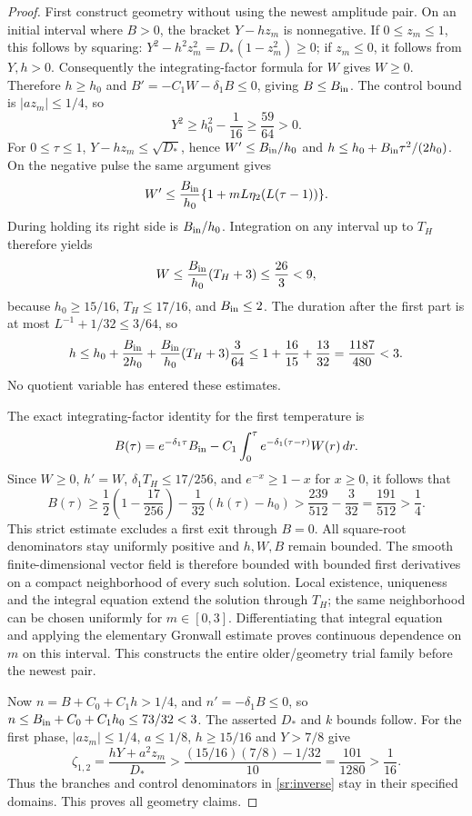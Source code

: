 \begin{proof}
First construct geometry without using the newest amplitude pair.
On an initial interval where $B>0$, the bracket $Y-hz_m$ is
nonnegative. If $0\leq z_m\leq1$, this follows by squaring:
$Y^2-h^2z_m^2=D_*(1-z_m^2)\geq0$; if $z_m\leq0$, it follows
from $Y,h>0$. Consequently the integrating-factor formula for $W$
gives $W\geq0$. Therefore $h\geq h_0$ and
$B'=-C_1W-\delta_1B\leq0$, giving $B\leq B_{\rm in}$.
The control bound is $|az_m|\leq1/4$, so
\[
 Y^2\geq h_0^2-\frac1{16}\geq\frac{59}{64}>0.
\]
For $0\leq\tau\leq1$, $Y-hz_m\leq\sqrt{D_*}$, hence
$W'\leq B_{\rm in}/h_0$ and
$h\leq h_0+B_{\rm in}\tau^2/(2h_0)$.
On the negative pulse the same argument gives
\[
 W'\leq\frac{B_{\rm in}}{h_0}
          \{1+mL\eta_2(L(\tau-1))\}.
\]
During holding its right side is $B_{\rm in}/h_0$.
Integration on any interval up to $T_H$ therefore yields
\[
 W\leq\frac{B_{\rm in}}{h_0}(T_H+3)
 \leq\frac{26}{3}<9,
\]
because $h_0\geq15/16$, $T_H\leq17/16$, and $B_{\rm in}\leq2$.
The duration after the first part is at most
$L^{-1}+1/32\leq3/64$, so
\[
 h\leq h_0+\frac{B_{\rm in}}{2h_0}
       +\frac{B_{\rm in}}{h_0}(T_H+3)\frac3{64}
 \leq1+\frac{16}{15}+\frac{13}{32}
 =\frac{1187}{480}<3.
\]
No quotient variable has entered these estimates.

The exact integrating-factor identity for the first temperature is
\[
 B(\tau)=e^{-\delta_1\tau}B_{\rm in}
  -C_1\int_0^\tau e^{-\delta_1(\tau-r)}W(r)\,dr.
\]
Since $W\geq0$, $h'=W$, $\delta_1T_H\leq17/256$, and
$e^{-x}\geq1-x$ for $x\geq0$, it follows that
\[
 B(\tau)\geq\frac12\left(1-\frac{17}{256}\right)
          -\frac1{32}(h(\tau)-h_0)
 >\frac{239}{512}-\frac3{32}
 =\frac{191}{512}>\frac14.
\]
This strict estimate excludes a first exit through $B=0$.
All square-root denominators stay uniformly positive and $h,W,B$
remain bounded. The smooth finite-dimensional vector field is therefore
bounded with bounded first derivatives on a compact neighborhood
of every such solution. Local existence, uniqueness and the integral
equation extend the solution through $T_H$; the same neighborhood
can be chosen uniformly for $m\in[0,3]$. Differentiating that integral
equation and applying the elementary Gronwall estimate proves
continuous dependence on $m$ on this interval. This constructs the
entire older/geometry trial family before the newest pair.

Now $n=B+C_0+C_1h>1/4$, and
$n'=-\delta_1B\leq0$, so
$n\leq B_{\rm in}+C_0+C_1h_0\leq73/32<3$.
The asserted $D_*$ and $k$ bounds follow. For the first phase,
$|az_m|\leq1/4$, $a\leq1/8$, $h\geq15/16$ and $Y>7/8$
give
\[
 \zeta_{1,2}=\frac{hY+a^2z_m}{D_*}
 >\frac{(15/16)(7/8)-1/32}{10}
 =\frac{101}{1280}>\frac1{16}.
\]
Thus the branches and control denominators in \eqref{sr:inverse}
stay in their specified domains. This proves all geometry claims.


\end{proof}
